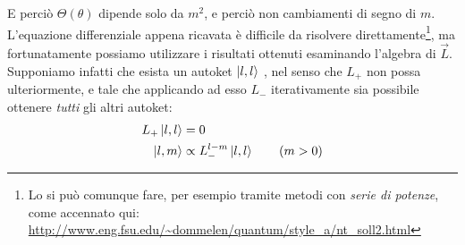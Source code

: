\documentclass[../../FisicaTeorica.tex]{subfiles}
\begin{document}
E perciò $\Theta(\theta)$ dipende solo da $m^2$, e perciò non  cambiamenti di segno di $m$.\\
L'equazione differenziale appena ricavata è difficile da risolvere direttamente\footnote{Lo si può comunque fare, per esempio tramite metodi con \textit{serie di potenze}, come accennato qui: \url{http://www.eng.fsu.edu/~dommelen/quantum/style_a/nt_soll2.html}}, ma fortunatamente possiamo utilizzare i risultati ottenuti esaminando l'algebra di $\vec{L}$. Supponiamo infatti che esista un autoket $\Ket{l,l}$ , nel senso che $L_+$ non possa  ulteriormente, e tale che applicando ad esso $L_-$ iterativamente sia possibile ottenere \textit{tutti} gli altri autoket:
\begin{align}
L_+ \Ket{l,l}&=0 \label{eqn:autoket-max}\\
\Ket{l,m} &\propto L_-^{l-m}\Ket{l,l} \label{eqn:autoket-abbassato} \qquad (m>0)
\end{align}
 
\end{document}
